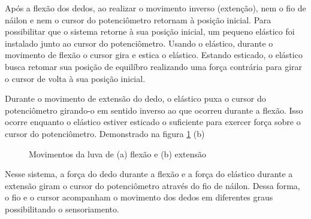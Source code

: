 \documentclass[
	12pt,				%
	openright,			%
	oneside,			%
	a4paper,			%
	english,			%
	brazil				%
	]{abntex2}
\begin{document}
		Após a flexão dos dedos, ao realizar o movimento inverso (extenção), nem o fio de náilon e nem o cursor do potenciômetro retornam à posição inicial. Para possibilitar que o sistema retorne à sua posição inicial, um pequeno elástico foi instalado junto ao cursor do potenciômetro. Usando o elástico, durante o movimento de flexão o cursor gira e estica o elástico. Estando esticado, o elástico busca retomar sua posição de equilíbro realizando uma força contrária para girar o cursor de volta à sua posição inicial. 
		
		Durante o movimento de extensão do dedo, o elástico puxa o cursor do potenciômetro girando-o em sentido inverso ao que ocorreu durante a flexão. Isso ocorre enquanto o elástico estiver esticado o suficiente para exercer força sobre o cursor do potenciômetro. Demonstrado na figura \ref{Fig:glove-flex-and-extend2} (b)
		

	\begin{figure}[!htb]
		 \centering
		 \caption{ Movimentos da luva de (a) flexão e (b) extensão} 
		 \centering
		 \label{Fig:glove-flex-and-extend2}
	\end{figure}


		Nesse sistema, a força do dedo durante a flexão e a força do elástico durante a extensão giram o cursor do potenciômetro através do fio de náilon. Dessa forma, o fio e o cursor acompanham o movimento dos dedos em diferentes graus possibilitando o sensoriamento.


\end{document}
